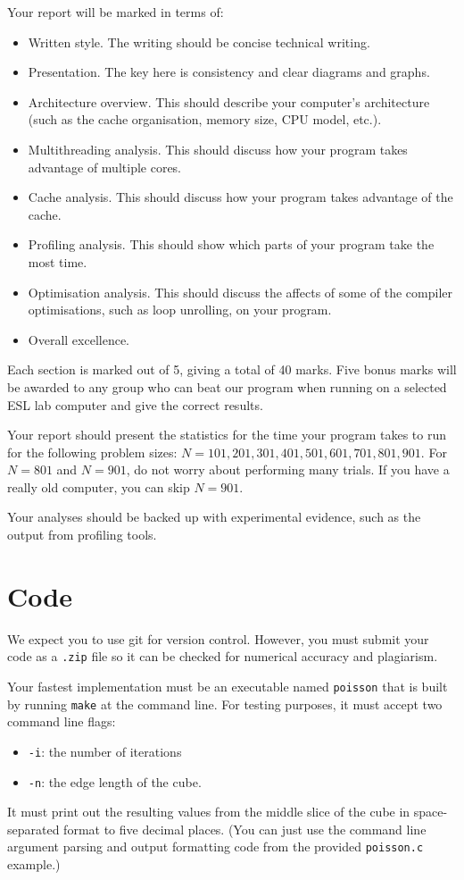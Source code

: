 \documentclass[a4paper,11pt]{article}
\newcommand{\code}[1]{\texttt{#1}}
\begin{document}
Your report will be marked in terms of:
%
\begin{itemize}
\item Written style.  The writing should be concise technical writing.
\item Presentation.  The key here is consistency and clear diagrams
  and graphs.
\item Architecture overview.  This should describe your computer's
  architecture (such as the cache organisation, memory size, CPU model,
  etc.).
\item Multithreading analysis.  This should discuss how your program
  takes advantage of multiple cores.
\item Cache analysis.  This should discuss how your program takes
  advantage of the cache.
\item Profiling analysis.  This should show which parts of your
  program take the most time.
\item Optimisation analysis.  This should discuss the affects of some
  of the compiler optimisations, such as loop unrolling, on your
  program.
\item Overall excellence.
\end{itemize}
%
Each section is marked out of 5, giving a total of 40 marks.  Five
bonus marks will be awarded to any group who can beat our program when
running on a selected ESL lab computer and give the correct results.

Your report should present the statistics for the time your program
takes to run for the following problem sizes: $N=101, 201, 301, 401,
501, 601, 701, 801, 901$.  For $N=801$ and $N=901$, do not worry about
performing many trials.  If you have a really old computer, you can
skip $N=901$.

Your analyses should be backed up with experimental evidence, such as
the output from profiling tools.




\section{Code}

We expect you to use git for version control.  However, you must
submit your code as a \code{.zip} file so it can be checked for
numerical accuracy and plagiarism.

Your fastest implementation must be an executable named \code{poisson}
that is built by running \code{make} at the command line.  For testing
purposes, it must accept two command line flags:
\begin{itemize}
  \item \code{-i}: the number of iterations
  \item \code{-n}: the edge length of the cube.
\end{itemize}
It must print out the resulting values from the middle slice of the
cube in space-separated format to five decimal places.  (You can just
use the command line argument parsing and output formatting code from
the provided \code{poisson.c} example.)
\end{document}
